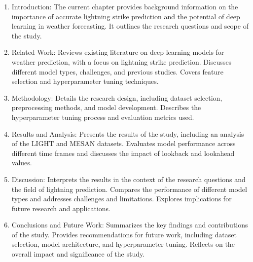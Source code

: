 \begin{enumerate}
	\item Introduction: The current chapter provides background information on the importance of accurate lightning strike prediction and the potential of deep learning in weather forecasting. It outlines the research questions and scope of the study.
	\item Related Work: Reviews existing literature on deep learning models for weather prediction, with a focus on lightning strike prediction. Discusses different model types, challenges, and previous studies. Covers feature selection and hyperparameter tuning techniques.
	\item Methodology: Details the research design, including dataset selection, preprocessing methods, and model development. Describes the hyperparameter tuning process and evaluation metrics used.
	\item Results and Analysis: Presents the results of the study, including an analysis of the LIGHT and MESAN datasets. Evaluates model performance across different time frames and discusses the impact of lookback and lookahead values.
	\item Discussion: Interprets the results in the context of the research questions and the field of lightning prediction. Compares the performance of different model types and addresses challenges and limitations. Explores implications for future research and applications.
	\item Conclusions and Future Work: Summarizes the key findings and contributions of the study. Provides recommendations for future work, including dataset selection, model architecture, and hyperparameter tuning. Reflects on the overall impact and significance of the study.
\end{enumerate}

